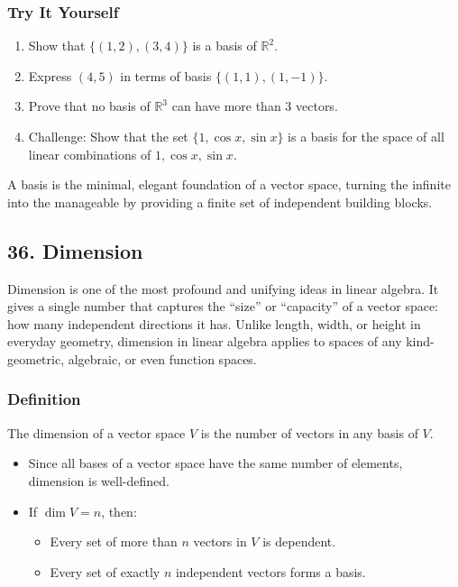 \documentclass[
  letterpaper,
  DIV=11,
  numbers=noendperiod]{scrreprt}
\providecommand{\tightlist}{%
  \setlength{\itemsep}{0pt}\setlength{\parskip}{0pt}}
\begin{document}
\subsubsection{Try It Yourself}\label{try-it-yourself-34}

\begin{enumerate}
\def\labelenumi{\arabic{enumi}.}
\tightlist
\item
  Show that \(\{(1,2), (3,4)\}\) is a basis of \(\mathbb{R}^2\).
\item
  Express \((4,5)\) in terms of basis \(\{(1,1), (1,-1)\}\).
\item
  Prove that no basis of \(\mathbb{R}^3\) can have more than 3 vectors.
\item
  Challenge: Show that the set \(\{1, \cos x, \sin x\}\) is a basis for
  the space of all linear combinations of \(1, \cos x, \sin x\).
\end{enumerate}

A basis is the minimal, elegant foundation of a vector space, turning
the infinite into the manageable by providing a finite set of
independent building blocks.

\subsection{36. Dimension}\label{dimension-1}

Dimension is one of the most profound and unifying ideas in linear
algebra. It gives a single number that captures the ``size'' or
``capacity'' of a vector space: how many independent directions it has.
Unlike length, width, or height in everyday geometry, dimension in
linear algebra applies to spaces of any kind-geometric, algebraic, or
even function spaces.

\subsubsection{Definition}\label{definition}

The dimension of a vector space \(V\) is the number of vectors in any
basis of \(V\).

\begin{itemize}
\item
  Since all bases of a vector space have the same number of elements,
  dimension is well-defined.
\item
  If \(\dim V = n\), then:

  \begin{itemize}
  \tightlist
  \item
    Every set of more than \(n\) vectors in \(V\) is dependent.
  \item
    Every set of exactly \(n\) independent vectors forms a basis.
  \end{itemize}
\end{itemize}
\end{document}

